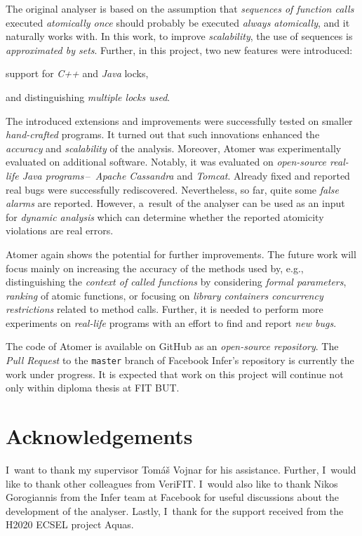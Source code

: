 The original analyser is based on the assumption that \emph{sequences of
function calls} executed \emph{atomically once} should probably be executed
\emph{always atomically}, and it naturally works with. In this work, to improve
\emph{scalability}, the use of sequences is \emph{approximated by sets}.
Further, in this project, two new features were introduced:
\begin{enumerate*}[label={(\roman*)}]
    \item
        support for \emph{C++} and \emph{Java} locks,

    \item
        and distinguishing \emph{multiple locks used}.
\end{enumerate*}

The introduced extensions and improvements were successfully tested on
smaller \emph{hand-crafted} programs. It turned out that such innovations
enhanced the \emph{accuracy} and \emph{scalability} of the analysis. Moreover,
Atomer was experimentally evaluated on additional software. \linebreak Notably,
it was evaluated on \emph{open-source real-life Java programs}\,--\,\emph{%
Apache Cassandra} and \emph{Tomcat}. Already fixed and reported real bugs
were successfully rediscovered. Nevertheless, so far, quite some \emph{false
alarms} are reported. However, a~result of the analyser can be used as an
input for \emph{dynamic analysis} which can determine whether the reported
atomicity violations are real errors.

Atomer again shows the potential for further improvements. The future work
will focus mainly on increasing the accuracy of the methods used by, e.g.,
distinguishing the \emph{context of called functions} by considering
\emph{formal parameters}, \emph{ranking} of atomic functions, or focusing on
\emph{library containers concurrency restrictions} related to method calls.
Further, it is needed to perform more experiments on \emph{real-life}
programs with an effort to find and report \emph{new bugs}.

The code of Atomer is available on GitHub as an \emph{open-source repository}.
The \emph{Pull Request} to the \texttt{master} branch of Facebook Infer's
repository is currently the work under progress. It is expected that work
on this project will continue not only within diploma thesis at FIT BUT.


\section*{Acknowledgements}
I~want to thank my supervisor Tomáš Vojnar for his assistance. Further,
I~would like to thank other colleagues from VeriFIT. I~would also like
to thank Nikos Gorogiannis from the Infer team at Facebook for useful
discussions about the development of the analyser. Lastly, I~thank for the
support received from the H2020 ECSEL project Aquas.
